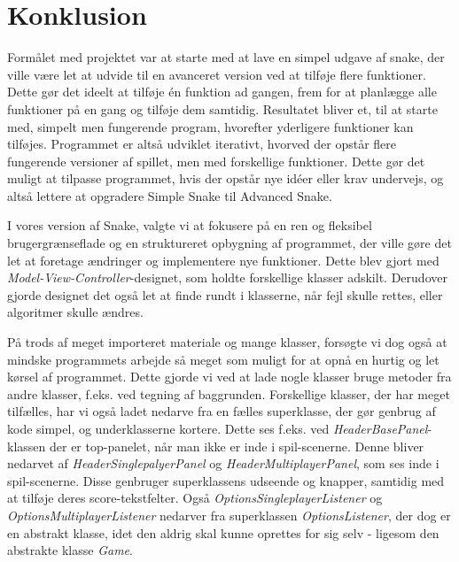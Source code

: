 \chapter{Konklusion}

Formålet med projektet var at starte med at lave en simpel udgave af snake, der ville være let at udvide til en avanceret version ved at tilføje flere funktioner. Dette gør det ideelt at tilføje én funktion ad gangen, frem for at planlægge alle funktioner på en gang og tilføje dem samtidig. Resultatet bliver et, til at starte med, simpelt men fungerende program, hvorefter yderligere funktioner kan tilføjes. Programmet er altså udviklet iterativt, hvorved der opstår flere fungerende versioner af spillet, men med forskellige funktioner. Dette gør det muligt at tilpasse programmet, hvis der opstår nye idéer eller krav undervejs, og altså lettere at opgradere Simple Snake til Advanced Snake.
\newline

I vores version af Snake, valgte vi at fokusere på en ren og fleksibel brugergrænseflade og en struktureret opbygning af programmet, der ville gøre det let at foretage ændringer og implementere nye funktioner. Dette blev gjort med \textit{Model-View-Controller}-designet, som holdte forskellige klasser adskilt. Derudover gjorde designet det også let at finde rundt i klasserne, når fejl skulle rettes, eller algoritmer skulle ændres.
\newline

På trods af meget importeret materiale og mange klasser, forsøgte vi dog også at mindske programmets arbejde så meget som muligt for at opnå en hurtig og let kørsel af programmet. Dette gjorde vi ved at lade nogle klasser bruge metoder fra andre klasser, f.eks. ved tegning af baggrunden. Forskellige klasser, der har meget tilfælles, har vi også ladet nedarve fra en fælles superklasse, der gør genbrug af kode simpel, og underklasserne kortere. Dette ses f.eks. ved \textit{HeaderBasePanel}-klassen der er top-panelet, når man ikke er inde i spil-scenerne. Denne bliver nedarvet af \textit{HeaderSinglepalyerPanel} og \textit{HeaderMultiplayerPanel}, som ses inde i spil-scenerne. Disse genbruger superklassens udseende og knapper, samtidig med at tilføje deres score-tekstfelter. Også \textit{OptionsSingleplayerListener} og \textit{OptionsMultiplayerListener} nedarver fra superklassen \textit{OptionsListener}, der dog er en abstrakt klasse, idet den aldrig skal kunne oprettes for sig selv - ligesom den abstrakte klasse \textit{Game}.
\newline

